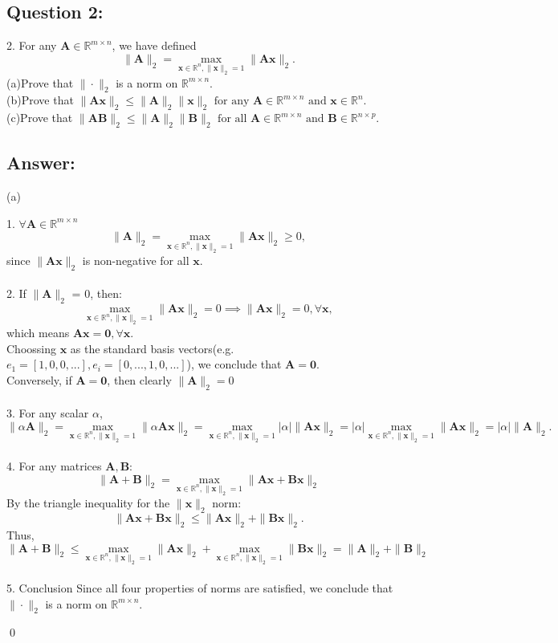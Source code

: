 \documentclass{article}
\newcommand{\R}{\mathbb{R}}
\renewenvironment{proof}{\begin{addmargin}[1em]{0em}\begin{newproof}}
{\end{newproof}\end{addmargin}\qed}
\begin{document}
\subsection*{Question 2:}
2. For any \(\bm{A} \in \R^{m \times n}\), we have defined
    \[
    \|\bm{A}\|_2 = \max_{ \bm{x} \in \R ^n, \| \bm{x} \|_2 = 1}\|\bm{A}\bm{x}\|_2.
    \]
    (a)Prove that \(\|\cdot\|_2\) is a norm on \(\R^{m \times n}\). \\
    (b)Prove that \(\|\bm{A}\bm{x}\|_2 \leq \|\bm{A}\|_2\|\bm{x}\|_2 \text{ for any } \bm{A} \in \R^{m \times n} \text{ and } \bm{x} \in \R^n. \)\\
    (c)Prove that \(\|\bm{A}\bm{B}\|_2 \leq \|\bm{A}\|_2\|\bm{B}\|_2 \text{ for all } \bm{A} \in \R^{m \times n} \text{ and } \bm{B} \in \R^{n \times p}.\)\\
\subsection*{Answer:}
(a)
\begin{proof}
    1. \(\forall \bm{A} \in \R^{m \times n}\)
    \[
    \|\bm{A}\|_2 = \max_{\bm{x} \in \R^n, \|\bm{x}\|_2 = 1} \|\bm{A}\bm{x}\|_2 \geq 0,
    \]
    since \(\|\bm{A}\bm{x}\|_2 \) is non-negative for all \(\bm{x}\). \\
    \\
    2. If \(\|\bm{A}\|_2\) = 0, then:
    \[
    \max_{\bm{x} \in \R^n, \|\bm{x}\|_2 = 1} \|\bm{A}\bm{x}\|_2 = 0 \implies \|\bm{A}\bm{x}\|_2 = 0 ,\forall \bm{x},
    \]
    which means \( \bm{A}\bm{x} = \bm{0}, \forall \bm{x} \). \\
    Choossing \(\bm{x}\) as the standard basis vectors(e.g. \(e_1 = [1, 0, 0, ...], e_i = [0, ..., 1, 0, ...]\)), we conclude that \(\bm{A} = \bm{0}\).\\
    Conversely, if \(\bm{A} = \bm{0}\), then clearly \(\|\bm{A}\|_2 = 0\) \\
    \\
    3.
    For any scalar \(\alpha\),
    \[
    \|\alpha \bm{A}\|_2 = \max_{\bm{x} \in \R^n, \|\bm{x}\|_2 = 1} \|\alpha \bm{A}\bm{x}\|_2 = \max_{\bm{x} \in \R^n, \|\bm{x}\|_2 = 1} |\alpha| \| \bm{A}\bm{x}\|_2 = |\alpha| \max_{\bm{x} \in \R^n, \|\bm{x}\|_2 = 1} \| \bm{A}\bm{x}\|_2 = |\alpha|\|\bm{A}\|_2.
    \]
    \\
    4.
    For any matrices \(\bm{A}, \bm{B}\):
    \[
    \|\bm{A} + \bm{B}\|_2 = \max_{\bm{x} \in \R^n, \|\bm{x}\|_2 = 1} \|\bm{A}\bm{x} + \bm{B}\bm{x}\|_2
    \]
    By the triangle inequality for the \(\|\bm{x}\|_2\) norm: \\
    \[
    \|\bm{A}\bm{x} + \bm{B}\bm{x}\|_2 \leq \|\bm{A}\bm{x}\|_2 + \|\bm{B}\bm{x}\|_2.
    \]
    Thus,
    \[
    \|\bm{A} + \bm{B}\|_2 \leq \max_{\bm{x} \in \R^n, \|\bm{x}\|_2 = 1} \|\bm{A}\bm{x}\|_2 + \max_{\bm{x} \in \R^n, \|\bm{x}\|_2 = 1} \|\bm{B}\bm{x}\|_2 = \|\bm{A}\|_2 + \|\bm{B}\|_2
    \]
    \\
    5. Conclusion
    Since all four properties of norms are satisfied, we conclude that \(\|\cdot\|_2\) is a norm on \(\R^{m \times n}\). 
\end{proof}
\end{document}
